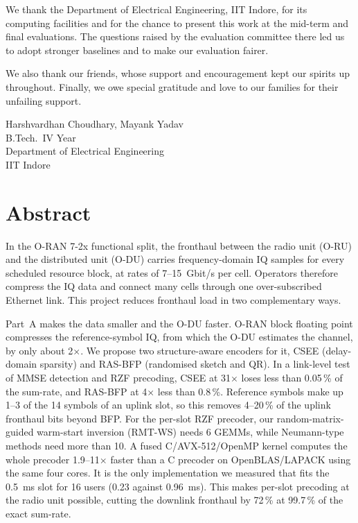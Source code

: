 \documentclass[12pt,a4paper,oneside]{report}
\newcommand{\studentA}{Harshvardhan Choudhary}
\newcommand{\studentB}{Mayank Yadav}
\newcommand{\discipline}{Electrical Engineering}
\theoremstyle{definition}
\begin{document}
We thank the Department of \discipline, IIT Indore, for its computing facilities and for the chance to present this work at the mid-term and final evaluations. The questions raised by the evaluation committee there led us to adopt stronger baselines and to make our evaluation fairer.

We also thank our friends, whose support and encouragement kept our spirits up throughout. Finally, we owe special gratitude and love to our families for their unfailing support.

\vspace{2cm}
\noindent
\studentA, \studentB\\
B.Tech.\ IV Year\\
Department of \discipline\\
IIT Indore

\chapter*{Abstract}
In the O-RAN 7-2x functional split, the fronthaul between the radio unit (O-RU) and the distributed unit (O-DU) carries frequency-domain IQ samples for every scheduled resource block, at rates of 7--15~Gbit/s per cell. Operators therefore compress the IQ data and connect many cells through one over-subscribed Ethernet link. This project reduces fronthaul load in two complementary ways.

Part~A makes the data smaller and the O-DU faster. O-RAN block floating point compresses the reference-symbol IQ, from which the O-DU estimates the channel, by only about 2$\times$. We propose two structure-aware encoders for it, CSEE (delay-domain sparsity) and RAS-BFP (randomised sketch and QR). In a link-level test of MMSE detection and RZF precoding, CSEE at 31$\times$ loses less than 0.05\,\% of the sum-rate, and RAS-BFP at 4$\times$ less than 0.8\,\%. Reference symbols make up 1--3 of the 14 symbols of an uplink slot, so this removes 4--20\,\% of the uplink fronthaul bits beyond BFP. For the per-slot RZF precoder, our random-matrix-guided warm-start inversion (RMT-WS) needs 6 GEMMs, while Neumann-type methods need more than 10. A fused C/AVX-512/OpenMP kernel computes the whole precoder 1.9--11$\times$ faster than a C precoder on OpenBLAS/LAPACK using the same four cores. It is the only implementation we measured that fits the 0.5~ms slot for 16 users (0.23 against 0.96~ms). This makes per-slot precoding at the radio unit possible, cutting the downlink fronthaul by 72\,\% at 99.7\,\% of the exact sum-rate.
\end{document}
